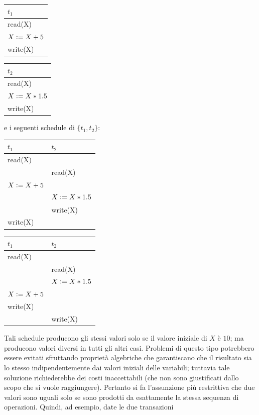 \begin{multicols}{2}  
 \begin{tabular}{|l|}
   \hline
   $t_1$\\
   \hline
   read(X)\\ 
   $X\vcentcolon=X+5$\\ 
   write(X)\\ 
   \hline
  \end{tabular}

  \begin{tabular}{|l|}
  \hline
   $t_2$\\
   \hline
   read(X)\\ 
   $X\vcentcolon=X*1.5$\\ 
   write(X)\\
   \hline
  \end{tabular}

 \end{multicols}

 e i seguenti schedule di $\{t_1 ,t_2\}$:
\begin{multicols}{2}  
 \begin{tabular}{|l|l|}
 \hline
 $t_1$ & $t_2$\\
 \hline
   read(X) & \\
   & read(X)\\
   $X\vcentcolon=X+5$ & \\ 
   & $X\vcentcolon=X*1.5$\\
   & write(X)\\ 
   write(X) &\\ 
   \hline
  \end{tabular}

  \begin{tabular}{|l|l|}
   \hline
   $t_1$ & $t_2$\\
   \hline
   read(X) & \\
   & read(X)\\
   & $X\vcentcolon=X*1.5$\\
   $X\vcentcolon=X+5$ & \\ 
   write(X) &\\   
   & write(X)\\
   \hline
  \end{tabular}
 \end{multicols}
 
Tali schedule producono gli stessi valori solo se il valore iniziale di $X$ è $10$; ma producono valori
diversi in tutti gli altri casi. Problemi di questo tipo potrebbero essere evitati sfruttando proprietà
algebriche che garantiscano che il risultato sia lo stesso indipendentemente dai valori iniziali delle
variabili; tuttavia tale soluzione richiederebbe dei costi inaccettabili (che non sono giustificati dallo
scopo che si vuole raggiungere). Pertanto si fa l'assunzione più restrittiva che due valori sono
uguali solo se sono prodotti da esattamente la stessa sequenza di operazioni. Quindi, ad esempio,
date le due transazioni

